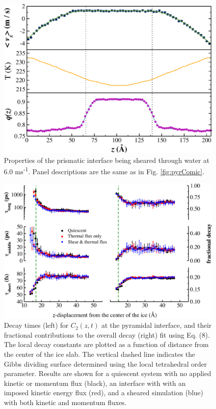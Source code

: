 \documentclass[journal = jpccck, manuscript = suppinfo]{achemso}
\begin{document}
\begin{figure}
\includegraphics[width=\linewidth]{Pri_comic_strip}
\caption{\label{fig:pComic} Properties of the prismatic interface
  being sheared through water at 6.0 ms\textsuperscript{-1}.  Panel
  descriptions are the same as in Fig. \ref{fig:pyrComic}.}
\end{figure}


\begin{figure}
\includegraphics[width=\linewidth]{Pyr_lcorrz}
\caption{\label{fig:Pyrorient} Decay times (left) for $C_2(z,t)$ at
  the pyramidal interface, and their fractional contributions to the
  overall decay (right) fit using Eq. (8). The local decay constants
  are plotted as a function of distance from the center of the ice
  slab. The vertical dashed line indicates the Gibbs dividing surface
  determined using the local tetrahedral order parameter.  Results are
  shown for a quiescent system with no applied kinetic or momentum
  flux (black), an interface with with an imposed kinetic energy flux
  (red), and a sheared simulation (blue) with both kinetic and
  momentum fluxes.}
\end{figure}
\end{document}
